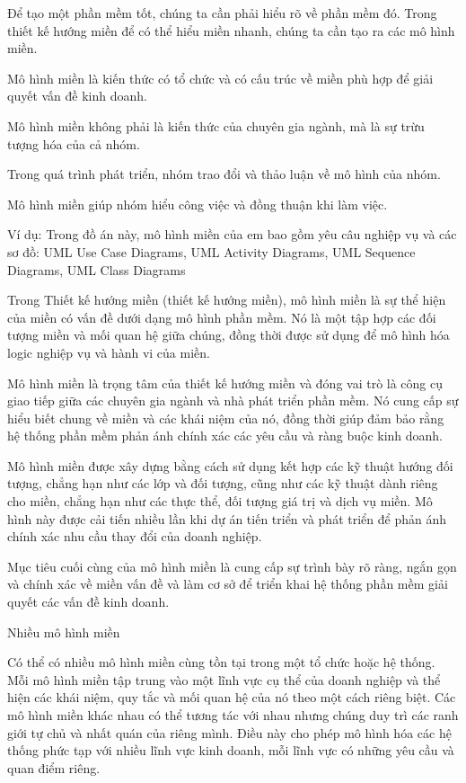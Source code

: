 



Để tạo một phần mềm tốt, chúng ta cần phải hiểu rõ về phần mềm đó. Trong thiết kế hướng miền để có thể hiểu miền nhanh, chúng ta cần tạo ra các mô hình miền.

Mô hình miền là kiến thức có tổ chức và có cấu trúc về miền phù hợp để giải quyết vấn đề kinh doanh.

Mô hình miền không phải là kiến thức của chuyên gia ngành, mà là sự trừu tượng hóa của cả nhóm.

Trong quá trình phát triển, nhóm trao đổi và thảo luận về mô hình của nhóm.

Mô hình miền giúp nhóm hiểu công việc và đồng thuận khi làm việc.

Ví dụ: Trong đồ án này, mô hình miền của em bao gồm yêu câu nghiệp vụ và các sơ đồ: UML Use Case Diagrams, UML Activity Diagrams, UML Sequence Diagrams, UML Class Diagrams 

 

Trong Thiết kế hướng miền (thiết kế hướng miền), mô hình miền là sự thể hiện của miền có vấn đề dưới dạng mô hình phần mềm. Nó là một tập hợp các đối tượng miền và mối quan hệ giữa chúng, đồng thời được sử dụng để mô hình hóa logic nghiệp vụ và hành vi của miền.

Mô hình miền là trọng tâm của thiết kế hướng miền và đóng vai trò là công cụ giao tiếp giữa các chuyên gia ngành và nhà phát triển phần mềm. Nó cung cấp sự hiểu biết chung về miền và các khái niệm của nó, đồng thời giúp đảm bảo rằng hệ thống phần mềm phản ánh chính xác các yêu cầu và ràng buộc kinh doanh.

Mô hình miền được xây dựng bằng cách sử dụng kết hợp các kỹ thuật hướng đối tượng, chẳng hạn như các lớp và đối tượng, cũng như các kỹ thuật dành riêng cho miền, chẳng hạn như các thực thể, đối tượng giá trị và dịch vụ miền. Mô hình này được cải tiến nhiều lần khi dự án tiến triển và phát triển để phản ánh chính xác nhu cầu thay đổi của doanh nghiệp.

Mục tiêu cuối cùng của mô hình miền là cung cấp sự trình bày rõ ràng, ngắn gọn và chính xác về miền vấn đề và làm cơ sở để triển khai hệ thống phần mềm giải quyết các vấn đề kinh doanh.
 

Nhiều mô hình miền

Có thể có nhiều mô hình miền cùng tồn tại trong một tổ chức hoặc hệ thống. Mỗi mô hình miền tập trung vào một lĩnh vực cụ thể của doanh nghiệp và thể hiện các khái niệm, quy tắc và mối quan hệ của nó theo một cách riêng biệt. Các mô hình miền khác nhau có thể tương tác với nhau nhưng chúng duy trì các ranh giới tự chủ và nhất quán của riêng mình. Điều này cho phép mô hình hóa các hệ thống phức tạp với nhiều lĩnh vực kinh doanh, mỗi lĩnh vực có những yêu cầu và quan điểm riêng. 